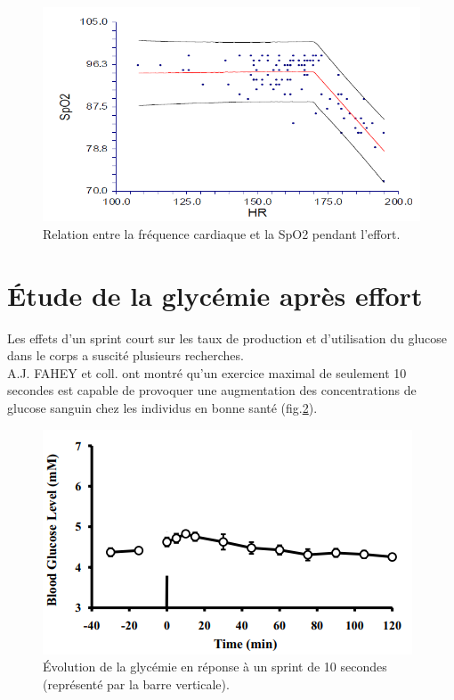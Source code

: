          \begin{figure}[H]
            \centering
            \includegraphics[scale=0.6]{images/spo2_fc2.PNG}
            \caption{\label{fig:spo2_fc2} Relation entre la fréquence cardiaque et la SpO2 pendant l'effort.}
        \end{figure} 
        

    \section{Étude de la glycémie après effort}
        
        Les effets d'un sprint court sur les taux de production et d'utilisation du glucose dans le corps a suscité plusieurs recherches.\\

        A.J. FAHEY et coll. \cite{fahey12} ont montré qu'un exercice maximal de seulement 10 secondes est capable de provoquer une augmentation des concentrations de glucose sanguin chez les individus en bonne santé (fig.\ref{fig:glycemie_posteffort}).\\
        
        \begin{figure}[H]
            \centering
            \includegraphics[scale=0.9]{images/glycemie_posteffort.PNG}
            \caption{\label{fig:glycemie_posteffort} Évolution de la glycémie en réponse à un sprint de 10 secondes (représenté par la barre verticale).}
        \end{figure} 

